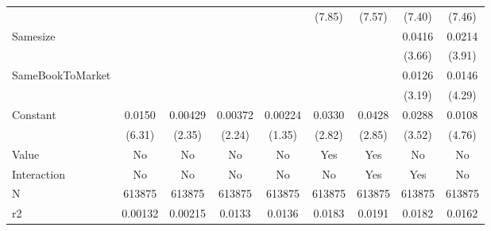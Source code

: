 {\begin{tabular}{l*{8}{c}}
                    &                     &                     &                     &                     &      (7.85)         &      (7.57)         &      (7.40)         &      (7.46)         \\
[1em]
Samesize            &                     &                     &                     &                     &                     &                     &      0.0416\sym{***}&      0.0214\sym{***}\\
                    &                     &                     &                     &                     &                     &                     &      (3.66)         &      (3.91)         \\
[1em]
SameBookToMarket    &                     &                     &                     &                     &                     &                     &      0.0126\sym{**} &      0.0146\sym{***}\\
                    &                     &                     &                     &                     &                     &                     &      (3.19)         &      (4.29)         \\
[1em]
Constant            &      0.0150\sym{***}&     0.00429\sym{*}  &     0.00372\sym{*}  &     0.00224         &      0.0330\sym{**} &      0.0428\sym{**} &      0.0288\sym{***}&      0.0108\sym{***}\\
                    &      (6.31)         &      (2.35)         &      (2.24)         &      (1.35)         &      (2.82)         &      (2.85)         &      (3.52)         &      (4.76)         \\
\hline
Value               &          No         &          No         &          No         &          No         &         Yes         &         Yes         &          No         &          No         \\
Interaction         &          No         &          No         &          No         &          No         &          No         &         Yes         &         Yes         &          No         \\
N                   &      613875         &      613875         &      613875         &      613875         &      613875         &      613875         &      613875         &      613875         \\
r2                  &     0.00132         &     0.00215         &      0.0133         &      0.0136         &      0.0183         &      0.0191         &      0.0182         &      0.0162         \\

\end{tabular}}
